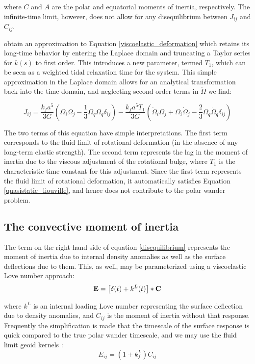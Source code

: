 \documentclass[extra,mreferee]{gji}
\begin{document}
where $C$ and $A$ are the polar and equatorial moments of inertia, respectively.
The infinite-time limit, however, does not allow for any disequilibrium between $J_{ij}$ and $C_{ij}$.

\citet{ricard1993polar} obtain an approximation to Equation \ref{viscoelastic_deformation} which retains its long-time behavior by entering the Laplace domain and truncating a Taylor series for $k(s)$ to first order.  
This introduces a new parameter, termed $T_1$, which can be seen as a weighted tidal relaxation time for the system.  
This simple approximation in the Laplace domain allows for an analytical transformation back into the time domain, and neglecting second order terms in $\dot{\Omega}$ we find:

\begin{equation}
J_{ij} = \frac{k_f a^5}{3 G} \left( \Omega_i \Omega_j - \frac{1}{3} \Omega_q \Omega_q \delta_{ij} \right) -
 \frac{k_f a^5 T_1}{3G} \left(\dot{\Omega}_i \Omega_j + \Omega_i \dot{\Omega}_j - \frac{2}{3} \Omega_q \dot{\Omega}_q \delta_{ij} \right)
\label{rotational_deformation}
\end{equation}

The two terms of this equation have simple interpretations.  
The first term corresponds to the fluid limit of rotational deformation (in the absence of any long-term elastic strength).  
The second term represents the lag in the moment of inertia due to the viscous adjustment of the rotational bulge, where $T_1$ is the characteristic time constant for this adjustment.
Since the first term represents the fluid limit of rotational deformation, it automatically satisfies Equation \ref{quasistatic_liouville}, and hence does not contribute to the polar wander problem.

\subsection{The convective moment of inertia}

The term on the right-hand side of equation \ref{disequilibrium} represents the moment of inertia due to internal density anomalies as well as the surface deflections due to them.
This, as well, may be parameterized using a viscoelastic Love number approach:
\begin{equation} 
{\bf E} = \left[ \delta(t) + k^L(t) \right] * {\bf C}
\end{equation}

where $k^L$ is an internal loading Love number representing the surface deflection due to density anomalies, and $C_{ij}$ is the moment of inertia without that response.
Frequently the simplification is made that the timescale of the surface response is quick compared to the true polar wander timescale, and we may use the fluid limit geoid kernels \citep[e.g.][]{richards1984geoid}:  
\begin{equation}
E_{ij} = (1+k^L_f) C_{ij}
\end{equation}
\end{document}
